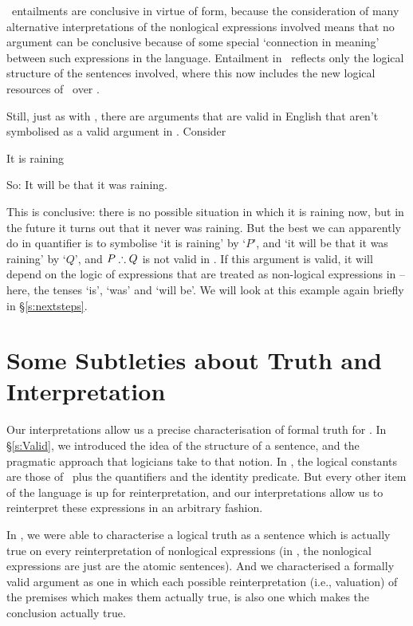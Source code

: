 \begin{earg}
\FOL\ entailments are conclusive in virtue of form, because the consideration of many alternative interpretations of the nonlogical expressions involved means that no argument can be conclusive because of some special `connection in meaning' between such expressions in the language. Entailment in \FOL\ reflects only the logical structure of the sentences involved, where this now includes the new logical resources of \FOL\ over \TFL.

Still, just as with \TFL, there are arguments that are valid in English that aren't symbolised as a valid argument in \FOL. Consider \begin{earg}
\item[] It is raining
\item[So:] It will be that it was raining.
\end{earg} This is conclusive: there is no possible situation in which it is raining now, but in the future it turns out that it never was raining. But the best we can apparently do in quantifier is to symbolise `it is raining' by `$P$', and `it will be that it was raining' by `$Q$', and $P \mathrel{\therefore} Q$ is not valid in \FOL. If this argument is valid, it will depend on the logic of expressions that are treated as non-logical expressions in \FOL – here, the tenses `is', `was' and `will be'. We will look at this example again briefly in §\ref{s:nextsteps}.

\section{Some Subtleties about Truth and Interpretation} %

Our interpretations allow us a precise characterisation of formal truth for \FOL. In §\ref{s:Valid}, we introduced the idea of the structure of a sentence, and the pragmatic approach that logicians take to that notion. In \FOL, the logical constants are those of \TFL\ plus the quantifiers and the identity predicate. But every other item of the language is up for reinterpretation, and our interpretations allow us to reinterpret these expressions in an arbitrary fashion.

In \TFL, we were able to characterise a logical truth as a sentence which is actually true on every reinterpretation of nonlogical expressions (in \TFL, the nonlogical expressions are just are the atomic sentences). And we characterised a formally valid argument as one in which each possible reinterpretation (i.e., valuation) of the  premises which makes them actually true, is also one which makes the conclusion actually true.


\end{earg}
